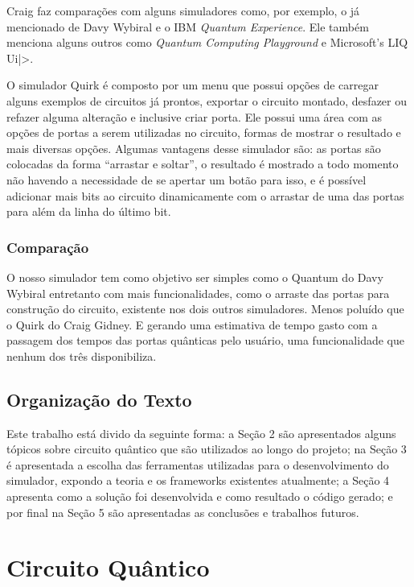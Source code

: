 \documentclass[a4paper, 12pt, oneside]{book}
\begin{document}
Craig faz comparações com alguns simuladores como, por exemplo, o já mencionado de Davy Wybiral e o IBM \textit{Quantum Experience}. Ele também menciona alguns outros como \textit{Quantum Computing Playground} e Microsoft's LIQ Ui|>.

O simulador Quirk é composto por um menu que possui opções de carregar alguns exemplos de circuitos já prontos, exportar o circuito montado, desfazer ou refazer alguma alteração e inclusive criar porta. Ele possui uma área com as opções de portas a serem utilizadas no circuito, formas de mostrar o resultado e mais diversas opções. Algumas vantagens desse simulador são: as portas são colocadas da forma ``arrastar e soltar'', o resultado é mostrado a todo momento não havendo a necessidade de se apertar um botão para isso, e é possível adicionar mais bits ao circuito dinamicamente com o arrastar de uma das portas para além da linha do último bit.

\subsection{Comparação}

O nosso simulador tem como objetivo ser simples como o Quantum do Davy Wybiral entretanto com mais funcionalidades, como o arraste das portas para construção do circuito, existente nos dois outros simuladores. Menos poluído que o Quirk do Craig Gidney. E gerando uma estimativa de tempo gasto com a passagem dos tempos das portas quânticas pelo usuário, uma funcionalidade que nenhum dos três disponibiliza.

\section{Organização do Texto}

Este trabalho está divido da seguinte forma: a Seção 2 são apresentados alguns tópicos sobre circuito quântico que são utilizados ao longo do projeto; na Seção 3 é apresentada a escolha das ferramentas utilizadas para o desenvolvimento do simulador, expondo a teoria e os frameworks existentes atualmente; a Seção 4 apresenta como a solução foi desenvolvida e como resultado o código gerado; e por final na Seção 5 são apresentadas as conclusões e trabalhos futuros.

\chapter{Circuito Quântico}
\end{document}
